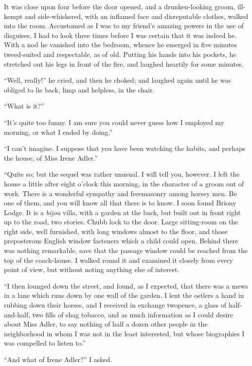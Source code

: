 It was close upon four before the door opened, and a
drunken-looking groom, ill-kempt and side-whiskered, with an
inflamed face and disreputable clothes, walked into the room.
Accustomed as I was to my friend’s amazing powers in the
use of disguises, I had to look three times before I was certain
that it was indeed he. With a nod he vanished into the
bedroom, whence he emerged in five minutes tweed-suited and
respectable, as of old. Putting his hands into his pockets, he
stretched out his legs in front of the fire, and laughed heartily
for some minutes.

“Well, really!” he cried, and then he choked; and laughed
again until he was obliged to lie back, limp and helpless, in the
chair.

“What is it?”

“It’s quite too funny. I am sure you could never guess
how I employed my morning, or what I ended by doing.”

“I can’t imagine. I suppose that you have been watching
the habits, and perhaps the house, of Miss Irene Adler.”

“Quite so; but the sequel was rather unusual. I will tell
you, however. I left the house a little after eight o’clock this
morning, in the character of a groom out of work. There is
a wonderful sympathy and freemasonry among horsey men.
Be one of them, and you will know all that there is to know.
I soon found Briony Lodge. It is a \textit{bijou} villa, with a garden
at the back, but built out in front right up to the road, two
stories. Chubb lock to the door. Large sitting-room on the
right side, well furnished, with long windows almost to the
floor, and those preposterous English window fasteners which
a child could open. Behind there was nothing remarkable,
save that the passage window could be reached from the top
of the coach-house. I walked round it and examined it closely
from every point of view, but without noting anything else of
interest.

“I then lounged down the street, and found, as I expected,
that there was a mews in a lane which runs down by one wall
of the garden. I lent the ostlers a hand in rubbing down
their horses, and I received in exchange twopence, a glass of
half-and-half, two fills of shag tobacco, and as much information
as I could desire about Miss Adler, to say nothing of half
a dozen other people in the neighborhood in whom I was not
in the least interested, but whose biographies I was compelled
to listen to.”

“And what of Irene Adler?” I asked.

